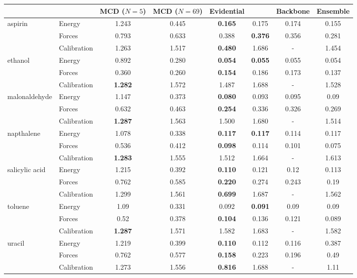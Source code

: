 \begin{tabular}{llcccc|c|c}
\toprule
{} & & MCD ($N=5$) & MCD ($N=69$) & Evidential & \oursacro{} & Backbone & Ensemble\\
\midrule
\multirow{3}{*}{aspirin} & Energy & 1.243 & 0.445 & \textbf{0.165} & 0.175 & 0.174 & 0.155\\ & Forces & 0.793 & 0.633 & 0.388 & \textbf{0.376} & 0.356 &0.281\\ & Calibration & 1.263 & 1.517 & \textbf{0.480} & 1.686 & - & 1.454\\
\midrule
\multirow{3}{*}{ethanol} & Energy & 0.892 & 0.280 & \textbf{0.054} & \textbf{0.055} & 0.055 & 0.054\\ & Forces & 0.360 & 0.260 & \textbf{0.154} & 0.186 & 0.173 & 0.137\\ & Calibration & \textbf{1.282} & 1.572 & 1.487 & 1.688 & - & 1.528\\
\midrule
\multirow{3}{*}{malonaldehyde} & Energy & 1.147 & 0.373 & \textbf{0.080} & 0.093 & 0.095 & 0.09\\ & Forces & 0.632 & 0.463 & \textbf{0.254} & 0.336 & 0.326 & 0.269\\ & Calibration & \textbf{1.287} & 1.563 & 1.500 & 1.680 & - & 1.514\\
\midrule
\multirow{3}{*}{napthalene} & Energy  & 1.078 & 0.338 & \textbf{0.117} & \textbf{0.117} & 0.114 & 0.117\\ & Forces & 0.536 & 0.412 & \textbf{0.098} & 0.114 & 0.101 & 0.075\\ & Calibration & \textbf{1.283} & 1.555 & 1.512 & 1.664 & - & 1.613\\
\midrule
\multirow{3}{*}{salicylic acid} & Energy & 1.215 & 0.392 & \textbf{0.110} & 0.121 & 0.12 & 0.113\\ & Forces & 0.762 & 0.585 & \textbf{0.220} & 0.274 & 0.243 & 0.19\\ & Calibration & 1.299 & 1.561 & \textbf{0.699} & 1.687 & - & 1.562\\
\midrule
\multirow{3}{*}{toluene} & Energy & 1.09 & 0.331 & 0.092 & \textbf{0.091} & 0.09 & 0.09\\ & Forces & 0.52 & 0.378 & \textbf{0.104} & 0.136 & 0.121 & 0.089\\ & Calibration & \textbf{1.287} & 1.571 & 1.582 & 1.683 & - & 1.582\\
\midrule
\multirow{3}{*}{uracil} & Energy & 1.219 & 0.399 & \textbf{0.110} & 0.112 & 0.116 & 0.387\\ & Forces & 0.762 & 0.577 & \textbf{0.158} & 0.223 & 0.196 & 0.49\\ & Calibration & 1.273 & 1.556 & \textbf{0.816} & 1.688 & - & 1.11\\
\bottomrule
\end{tabular}